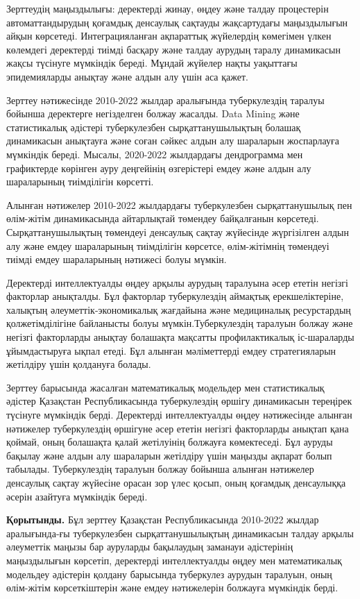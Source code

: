 \begin{multicols}{2}
Зерттеудің маңыздылығы: деректерді жинау, өңдеу және талдау процестерін
автоматтандырудың қоғамдық денсаулық сақтауды жақсартудағы маңыздылығын
айқын көрсетеді. Интеграцияланған ақпараттық жүйелердің көмегімен үлкен
көлемдегі деректерді тиімді басқару және талдау аурудың таралу
динамикасын жақсы түсінуге мүмкіндік береді. Мұндай жүйелер нақты
уақыттағы эпидемияларды анықтау және алдын алу үшін аса қажет.

Зерттеу нәтижесінде 2010-2022 жылдар аралығында туберкулездің таралуы
бойынша деректерге негізделген болжау жасалды. Data Mining және
статистикалық әдістері туберкулезбен сырқаттанушылықтың болашақ
динамикасын анықтауға және соған сәйкес алдын алу шараларын жоспарлауға
мүмкіндік береді. Мысалы, 2020-2022 жылдардағы дендрограмма мен
графиктерде көрінген ауру деңгейінің өзгерістері емдеу және алдын алу
шараларының тиімділігін көрсетті.

Алынған нәтижелер 2010-2022 жылдардағы туберкулезбен сырқаттанушылық пен
өлім-жітім динамикасында айтарлықтай төмендеу байқалғанын көрсетеді.
Сырқаттанушылықтың төмендеуі денсаулық сақтау жүйесінде жүргізілген
алдын алу және емдеу шараларының тиімділігін көрсетсе, өлім-жітімнің
төмендеуі тиімді емдеу шараларының нәтижесі болуы мүмкін.

Деректерді интеллектуалды өңдеу арқылы аурудың таралуына әсер ететін
негізгі факторлар анықталды. Бұл факторлар туберкулездің аймақтық
ерекшеліктеріне, халықтың әлеуметтік-экономикалық жағдайына және
медициналық ресурстардың қолжетімділігіне байланысты болуы
мүмкін.Туберкулездің таралуын болжау және негізгі факторларды анықтау
болашақта мақсатты профилактикалық іс-шараларды ұйымдастыруға ықпал
етеді. Бұл алынған мәліметтерді емдеу стратегияларын жетілдіру үшін
қолдануға болады.

Зерттеу барысында жасалған математикалық модельдер мен статистикалық
әдістер Қазақстан Республикасында туберкулездің өршігу динамикасын
тереңірек түсінуге мүмкіндік берді. Деректерді интеллектуалды өңдеу
нәтижесінде алынған нәтижелер туберкулездің өршігуне әсер ететін негізгі
факторларды анықтап қана қоймай, оның болашақта қалай жетілуінің
болжауға көмектеседі. Бұл ауруды бақылау және алдын алу шараларын
жетілдіру үшін маңызды ақпарат болып табылады. Туберкулездің таралуын
болжау бойынша алынған нәтижелер денсаулық сақтау жүйесіне орасан зор
үлес қосып, оның қоғамдық денсаулыққа әсерін азайтуға мүмкіндік береді.

{\bfseries Қорытынды.} Бұл зерттеу Қазақстан Республикасында 2010-2022
жылдар аралығында-ғы туберкулезбен сырқаттанушылықтың динамикасын талдау
арқылы әлеуметтік маңызы бар ауруларды бақылаудың заманауи әдістерінің
маңыздылығын көрсетіп, деректерді интеллектуалды өңдеу мен математикалық
модельдеу әдістерін қолдану барысында туберкулез аурудын таралуын, оның
өлім-жітім көрсеткіштерін және емдеу нәтижелерін болжауға мүмкіндік
берді.


\end{multicols}
